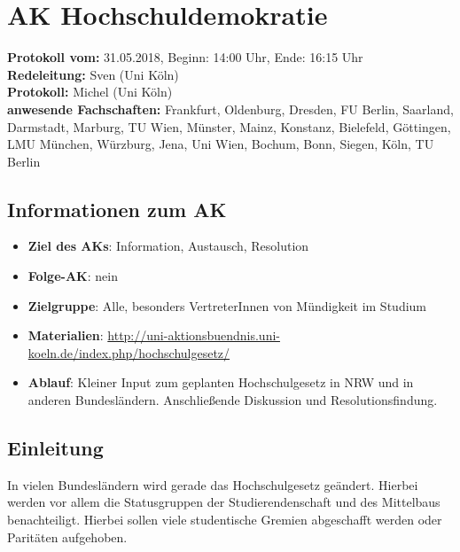 
\section{AK Hochschuldemokratie}

  \textbf{Protokoll vom:} 31.05.2018, %
  Beginn: 14:00 Uhr, %
  Ende: 16:15 Uhr \\ %
  \textbf{Redeleitung:} Sven (Uni Köln) \\
  \textbf{Protokoll:} Michel (Uni Köln) \\
  \textbf{anwesende Fachschaften:} Frankfurt, Oldenburg, Dresden, FU Berlin, Saarland, Darmstadt, Marburg, TU Wien, Münster, Mainz, Konstanz, Bielefeld, Göttingen, LMU München, Würzburg, Jena, Uni Wien, Bochum, Bonn, Siegen, Köln, TU Berlin

  \subsection*{Informationen zum AK}
    \begin{itemize}
      \item \textbf{Ziel des AKs}: Information, Austausch, Resolution
      \item \textbf{Folge-AK}: nein
      \item \textbf{Zielgruppe}: Alle, besonders VertreterInnen von Mündigkeit im Studium
      \item \textbf{Materialien}: \url{http://uni-aktionsbuendnis.uni-koeln.de/index.php/hochschulgesetz/}
      \item \textbf{Ablauf}: Kleiner Input zum geplanten Hochschulgesetz in NRW und in anderen Bundesländern. Anschließende Diskussion und Resolutionsfindung.
    \end{itemize}

  \subsection*{Einleitung}
    In vielen Bundesländern wird gerade das Hochschulgesetz geändert. Hierbei werden vor allem die Statusgruppen der Studierendenschaft und des Mittelbaus benachteiligt. Hierbei sollen viele studentische Gremien abgeschafft werden oder Paritäten aufgehoben. \\ \\

